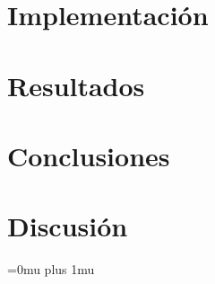 \documentclass[journal, onecolumn]{IEEEtran}
\numberwithin{equation}{section}
\numberwithin{figure}{section}
\numberwithin{table}{section}
\begin{document}
    \section{Implementación}
    
    
    

    \section{Resultados}
    


    \section{Conclusiones}
    


    \section{Discusión}
    


    \Urlmuskip=0mu plus 1mu\relax
    
    
\end{document}
